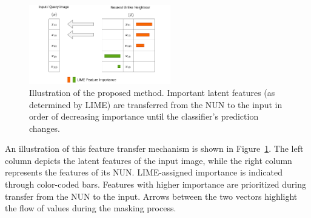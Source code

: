 \begin{figure}[htbp]
    \centering
    \includegraphics[width=0.55\textwidth]{img/masking/lime_on_latent_nun/NUN_method.drawio.png}
    \caption{Illustration of the proposed method. Important latent features (as determined by LIME) are transferred from the NUN to the input in order of decreasing importance until the classifier's prediction changes.}
    \label{fig:nun_lime}
\end{figure}


An illustration of this feature transfer mechanism is shown in Figure~\ref{fig:nun_lime}. The left column depicts the latent features of the input image, while the right column represents the features of its NUN. LIME-assigned importance is indicated through color-coded bars. Features with higher importance are prioritized during transfer from the NUN to the input. Arrows between the two vectors highlight the flow of values during the masking process.




